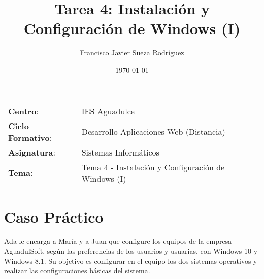 


\title{
\vspace{10ex}
\normalfont \normalsize
\Huge \textbf{Tarea 4: Instalación y Configuración de Windows (I)}
}
\author{Francisco Javier Sueza Rodríguez}
\date{\normalsize\today}



\maketitle

\thispagestyle{empty}

\vspace{68ex}

\begin{center}
    \begin{tabular}{l l}
        \textbf{Centro}: & IES Aguadulce \\
        \textbf{Ciclo Formativo}: & Desarrollo Aplicaciones Web (Distancia)\\
        \textbf{Asignatura}: & Sistemas Informáticos\\
        \textbf{Tema}: & Tema 4 -  Instalación y Configuración de Windows (I)\\
    \end{tabular}
\end{center}

\newpage

\tableofcontents

\newpage

\listoffigures

\newpage

\section{Caso Práctico}
Ada le encarga a María y a Juan que configure los equipos de la empresa AguadulSoft, según las preferencias de los usuarios y usuarias, con Windows 10 y Windows 8.1. Su objetivo es configurar en el equipo los dos sistemas operativos y realizar las configuraciones básicas del sistema.


